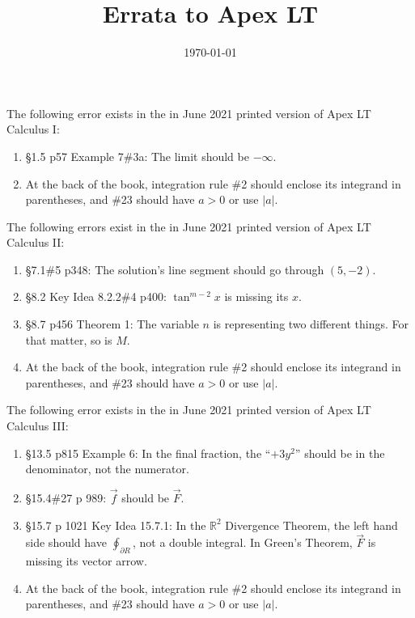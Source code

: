 \documentclass{amsart}
\title{Errata to Apex LT}
\date{\today}
\begin{document}

\maketitle

\noindent
The following error exists in the in June 2021 printed version of Apex LT Calculus I:
\begin{enumerate}
\item \S1.5 p57 Example 7\#3a: The limit should be $-\infty$.
\item At the back of the book, integration rule \#2 should enclose its integrand in parentheses, and \#23 should have $a>0$ or use $|a|$.
\label{2021-06-00I}
\end{enumerate}

\noindent
The following errors exist in the in June 2021 printed version of Apex LT Calculus II:
\begin{enumerate}
\item \S7.1\#5 p348: The solution's line segment should go through $(5,-2)$.
\item \S8.2 Key Idea 8.2.2\#4 p400: $\tan^{m-2}x$ is missing its $x$.
\item \S8.7 p456 Theorem 1: The variable $n$ is representing two different things.  For that matter, so is $M$.
\item At the back of the book, integration rule \#2 should enclose its integrand in parentheses, and \#23 should have $a>0$ or use $|a|$.
\label{2021-06-00II}
\end{enumerate}

\noindent
The following error exists in the in June 2021 printed version of Apex LT Calculus III:
\begin{enumerate}
\item \S13.5 p815 Example 6: In the final fraction, the ``$+3y^2$'' should be in the denominator, not the numerator.
\item \S15.4\#27 p 989: $\vec f$ should be $\vec F$.
\item \S15.7 p 1021 Key Idea 15.7.1: In the $\mathbb{R}^2$ Divergence Theorem, the left hand side should have $\oint_{\partial R}$, not a double integral.  In Green's Theorem, $\vec F$ is missing its vector arrow.
\item At the back of the book, integration rule \#2 should enclose its integrand in parentheses, and \#23 should have $a>0$ or use $|a|$.
\label{2021-06-00III}
\end{enumerate}
\end{document}
